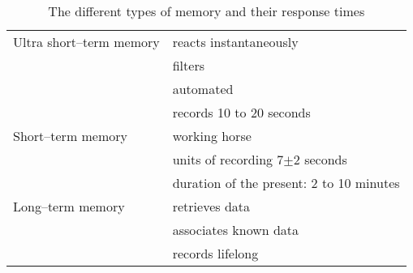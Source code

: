 \documentclass[../main.tex]{subfiles}
\begin{document}
     
      \begin{table}[htb]
        \centering
        \begin{tabular}{ll}
          Ultra short--term memory & reacts instantaneously \\
                                   & filters \\
                                   & automated \\
                                   & records 10 to 20 seconds \\
          Short--term memory       & working horse \\
                                   & units of recording 7$\pm$2 seconds \\
                                   & duration of the present: 2 to 10 minutes \\
          Long--term memory & retrieves data \\
                                   & associates known data \\
          & records lifelong \\
        \end{tabular}
        \caption{The different types of memory and their response times}
      \end{table}
\end{document}
